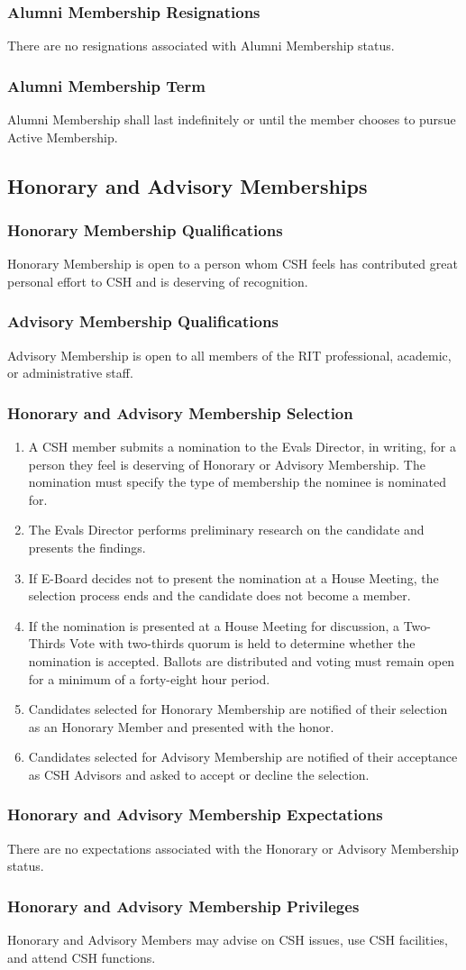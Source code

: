 \documentclass{article}
\newcommand{\asection}[1]{\subsection{#1} \label{#1}}
\newcommand{\asubsection}[1]{\subsubsection{#1} \label{#1}}
\begin{document}
\asubsection{Alumni Membership Resignations}
There are no resignations associated with Alumni Membership status.

\asubsection{Alumni Membership Term}
Alumni Membership shall last indefinitely or until the member chooses to pursue Active Membership.

\asection{Honorary and Advisory Memberships}

\asubsection{Honorary Membership Qualifications}
Honorary Membership is open to a person whom CSH feels has contributed great personal effort to CSH and is deserving of recognition.

\asubsection{Advisory Membership Qualifications}
Advisory Membership is open to all members of the RIT professional, academic, or administrative staff.

\asubsection{Honorary and Advisory Membership Selection}
\begin{enumerate}
	\item A CSH member submits a nomination to the Evals Director, in writing, for a person they feel is deserving of Honorary or Advisory Membership. The nomination must specify the type of membership the nominee is nominated for.
	\item The Evals Director performs preliminary research on the candidate and presents the findings.
	\item If E-Board decides not to present the nomination at a House Meeting, the selection process ends and the candidate does not become a member.
	\item If the nomination is presented at a House Meeting for discussion, a Two-Thirds Vote with two-thirds quorum is held to determine whether the nomination is accepted.
	      Ballots are distributed and voting must remain open for a minimum of a forty-eight hour period.
	\item Candidates selected for Honorary Membership are notified of their selection as an Honorary Member and presented with the honor.
	\item Candidates selected for Advisory Membership are notified of their acceptance as CSH Advisors and asked to accept or decline the selection.
\end{enumerate}

\asubsection{Honorary and Advisory Membership Expectations}
There are no expectations associated with the Honorary or Advisory Membership status.

\asubsection{Honorary and Advisory Membership Privileges}
Honorary and Advisory Members may advise on CSH issues, use CSH facilities, and attend CSH functions.
\end{document}
